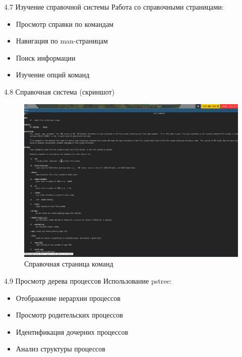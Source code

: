 \documentclass[
  ignorenonframetext,
  aspectratio=169,
  russian,
]{beamer}
\providecommand{\tightlist}{%
  \setlength{\itemsep}{0pt}\setlength{\parskip}{0pt}}
\begin{document}
\begin{frame}{4.7 Изучение справочной системы}
\label{ux438ux437ux443ux447ux435ux43dux438ux435-ux441ux43fux440ux430ux432ux43eux447ux43dux43eux439-ux441ux438ux441ux442ux435ux43cux44b}
Работа со справочными страницами:

\begin{itemize}[<+->]
\tightlist
\item
  Просмотр справки по командам
\item
  Навигация по man-страницам
\item
  Поиск информации
\item
  Изучение опций команд
\end{itemize}
\end{frame}

\begin{frame}{4.8 Справочная система (скриншот)}
\label{ux441ux43fux440ux430ux432ux43eux447ux43dux430ux44f-ux441ux438ux441ux442ux435ux43cux430-ux441ux43aux440ux438ux43dux448ux43eux442}
\begin{figure}[H]

{\centering \includegraphics[width=0.8\linewidth,height=\textheight,keepaspectratio]{image/man.png}

}

\caption{Справочная страница команд}

\end{figure}%
\end{frame}

\begin{frame}{4.9 Просмотр дерева процессов}
\label{ux43fux440ux43eux441ux43cux43eux442ux440-ux434ux435ux440ux435ux432ux430-ux43fux440ux43eux446ux435ux441ux441ux43eux432}
Использование pstree:

\begin{itemize}[<+->]
\tightlist
\item
  Отображение иерархии процессов
\item
  Просмотр родительских процессов
\item
  Идентификация дочерних процессов
\item
  Анализ структуры процессов
\end{itemize}
\end{frame}
\end{document}
